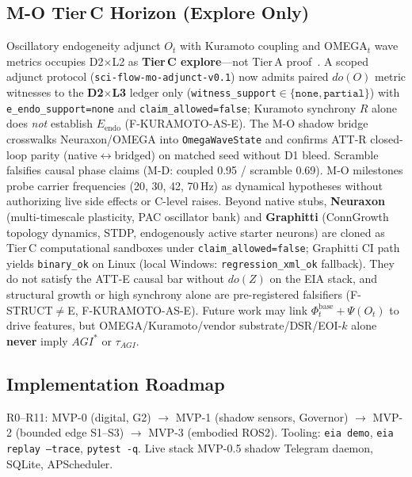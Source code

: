 \documentclass[11pt,a4paper]{article}
\theoremstyle{definition}
\begin{document}
\subsection{M-O Tier\,C Horizon (Explore Only)}
Oscillatory endogeneity adjunct $O_t$ with Kuramoto coupling and OMEGA$_t$ wave metrics occupies D2$\times$L2 as \textbf{Tier\,C explore}---not Tier\,A proof~\cite{kuznetsov2026cube}. A scoped adjunct protocol (\texttt{sci-flow-mo-adjunct-v0.1}) now admits paired $do(O)$ metric witnesses to the \textbf{D2$\times$L3} ledger only (\texttt{witness\_support}$\in\{\texttt{none},\texttt{partial}\}$) with \texttt{e\_endo\_support=none} and \texttt{claim\_allowed=false}; Kuramoto synchrony $R$ alone does \emph{not} establish $E_{\mathrm{endo}}$ (F-KURAMOTO-AS-E). The M-O shadow bridge crosswalks Neuraxon/OMEGA into \texttt{OmegaWaveState} and confirms ATT-R closed-loop parity (native$\leftrightarrow$bridged) on matched seed without D1 bleed. Scramble falsifies causal phase claims (M-D: coupled 0.95 / scramble 0.69). M-O milestones probe carrier frequencies (20, 30, 42, 70\,Hz) as dynamical hypotheses without authorizing live side effects or C-level raises. Beyond native stubs, \textbf{Neuraxon} (multi-timescale plasticity, PAC oscillator bank) and \textbf{Graphitti} (ConnGrowth topology dynamics, STDP, endogenously active starter neurons) are cloned as Tier\,C computational sandboxes under \texttt{claim\_allowed=false}; Graphitti CI path yields \texttt{binary\_ok} on Linux (local Windows: \texttt{regression\_xml\_ok} fallback). They do not satisfy the ATT-E causal bar without $do(Z)$ on the EIA stack, and structural growth or high synchrony alone are pre-registered falsifiers (F-STRUCT$\neq$E, F-KURAMOTO-AS-E). Future work may link $\Phi_t^{\mathrm{base}}+\Psi(O_t)$ to drive features, but OMEGA/Kuramoto/vendor substrate/DSR/EOI-$k$ alone \textbf{never} imply $AGI^{*}$ or $\tau_{AGI}$.

\subsection{Implementation Roadmap}
R0--R11: MVP-0 (digital, G2) $\to$ MVP-1 (shadow sensors, Governor) $\to$ MVP-2 (bounded edge S1--S3) $\to$ MVP-3 (embodied ROS2). Tooling: \texttt{eia demo}, \texttt{eia replay --trace}, \texttt{pytest -q}. Live stack MVP-0.5 shadow Telegram daemon, SQLite, APScheduler.
\end{document}
